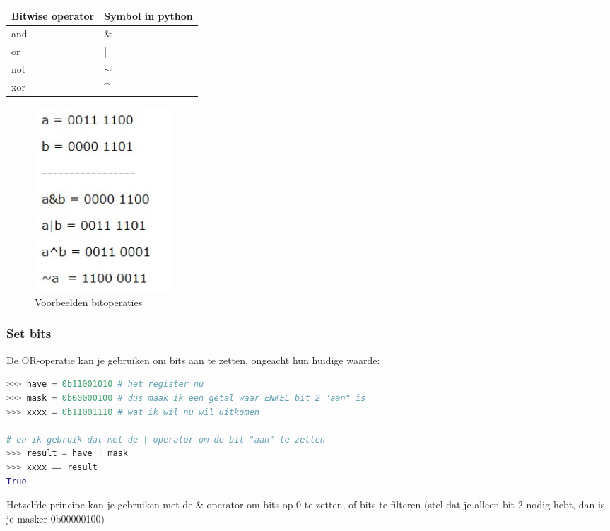 \documentclass{article}
\begin{document}
\begin{table}[H]
\begin{tabular}{|l|l|}
\hline
\multicolumn{1}{|c|}{\textbf{Bitwise operator}} & \multicolumn{1}{c|}{\textbf{Symbol in python}} \\ \hline
and                                             & \&                                             \\ \hline
or                                              & |                                              \\ \hline
not                                             & $\sim$                                         \\ \hline
xor                                             & \textasciicircum{}                             \\ \hline
\end{tabular}
\end{table}

\begin{figure}[H]
    \centering
    \includegraphics[width=0.25\textwidth]{bitoperator-examples.png}
    \caption{Voorbeelden bitoperaties}
\end{figure}

\subsubsection{Set bits}
De OR-operatie kan je gebruiken om bits aan te zetten, ongeacht hun huidige waarde:
\begin{lstlisting}[language=Python]
>>> have = 0b11001010 # het register nu 
>>> mask = 0b00000100 # dus maak ik een getal waar ENKEL bit 2 "aan" is
>>> xxxx = 0b11001110 # wat ik wil nu wil uitkomen

# en ik gebruik dat met de |-operator om de bit "aan" te zetten
>>> result = have | mask 
>>> xxxx == result
True 
\end{lstlisting}

Hetzelfde principe kan je gebruiken met de \&-operator om bits op 0 te zetten,
of bits te filteren (stel dat je alleen bit 2 nodig hebt, dan is je masker 0b00000100)
\end{document}
